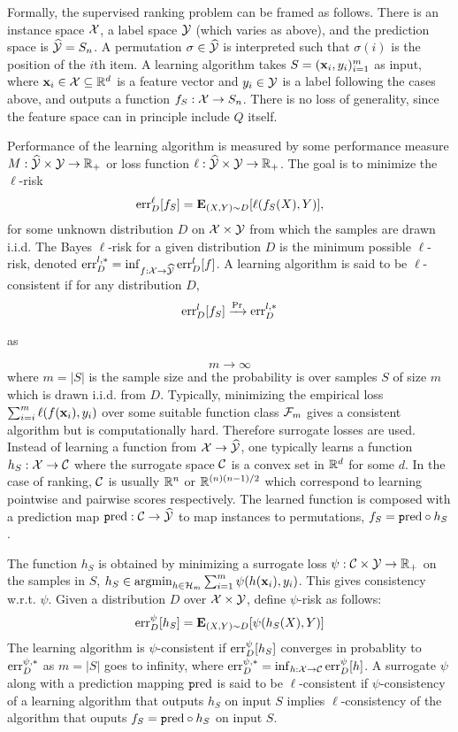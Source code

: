 Formally, the supervised ranking problem can be framed as follows. There is an
instance space ${\mathcal X}$, a label space ${\mathcal Y}$ (which varies as above), and the
prediction space is $\widehat{\mathcal{Y}} = S_n$. A permutation
$\sigma \in \widehat{\mathcal{Y}}$ is interpreted such that $\sigma(i)$ is the position of the
$i$th item. A learning algorithm
takes $S = ({\mathbf x}_i, y_i)_{i=1}^m$ as input,
where ${\mathbf x}_{i} \in {\mathcal X} \subseteq {\mathbb R}^d$ is a feature vector
and $y_i \in {\mathcal Y}$ is a label following the cases above,
and outputs a function
$f_S: {\mathcal X} \to S_n$.
There is no loss of generality, since the feature space can in principle 
include $Q$ itself.

Performance of the learning algorithm is measured by some performance measure
$M: \widehat{\mathcal{Y}} \times {\mathcal Y} \to {\mathbb R}_+$ or loss function
$\ell: \widehat{\mathcal{Y}} \times {\mathcal Y} \to {\mathbb R}_+$. The goal is to minimize the $\ell$-risk
\begin{align*}
  \text{err}_D^\ell[f_S] = {\mathbf E}_{({X}, Y) \sim D} [\ell(f_S({X}), Y)],
\end{align*}
for some unknown distribution $D$ on ${\mathcal X} \times {\mathcal Y}$ from which the samples are drawn i.i.d.
The Bayes $\ell$-risk for a given distribution $D$ is the minimum possible $\ell$-risk, denoted $\text{err}^{l,*}_D = \inf_{f:{\mathcal X} \to \widehat{\mathcal{Y}}} \text{err}^l_D[f]$. A learning algorithm is said to be $\ell$-consistent if for any distribution $D$,
$$\text{err}_D^l[f_S] \xrightarrow{\Pr} \text{err}_D^{l,*}$$
\begin{center}
 as
\end{center}
$$m \to \infty$$
where $m = |S|$ is the sample size and the probability is over samples $S$ of
size $m$ which is drawn i.i.d. from $D$. Typically, minimizing the empirical
loss $\sum_{i=i}^m \ell(f({\mathbf x}_i),y_i)$ over some suitable function class ${\mathcal F}_m$
gives a consistent algorithm but is computationally hard.
Therefore surrogate losses are used. Instead of learning a function from
${\mathcal X} \to \widehat{\mathcal{Y}}$, one typically learns a function $h_S:{\mathcal X} \to {\mathcal C}$ where the
surrogate space ${\mathcal C}$ is a convex set in ${\mathbb R}^d$ for some $d$. In the case of
ranking, ${\mathcal C}$ is usually ${\mathbb R}^n$ or ${\mathbb R}^{(n)(n-1)/2}$ which correspond to learning
pointwise and pairwise scores respectively.
The learned function is composed with a prediction map $\text{\texttt pred}: {\mathcal C} \to \widehat{\mathcal{Y}}$ to
map instances to permutations, $f_S = \text{\texttt pred} \circ h_S$.

The function $h_S$ is obtained by minimizing a surrogate loss $\psi:{\mathcal C} \times {\mathcal Y} \to {\mathbb R}_+$ on the samples in $S$, $h_S \in \textup{\textrm{argmin}}_{h\in{\mathcal H}_m}\sum_{i=1}^m \psi(h({\mathbf x}_i),y_i)$. This gives consistency w.r.t. $\psi$. Given a distribution $D$ over ${\mathcal X} \times {\mathcal Y}$, define $\psi$-risk as follows:
$$\text{err}_D^\psi[h_S] = {\mathbf E}_{(X,Y)\sim D}[\psi(h_S(X),Y)]$$
The learning algorithm is $\psi$-consistent if $\text{err}_D^\psi[h_S]$ converges in probablity to $\text{err}_D^{\psi,*}$ as $m = |S|$ goes to infinity, where $\text{err}_D^{\psi,*} = \inf_{h:{\mathcal X} \to {\mathcal C}}\text{err}_D^\psi[h]$. A surrogate $\psi$ along with a prediction mapping $\text{\texttt pred}$ is said to be $\ell$-consistent if $\psi$-consistency of a learning algorithm that outputs $h_S$ on input $S$ implies $\ell$-consistency of the algorithm that ouputs $f_S = \text{\texttt pred} \circ h_S$ on input $S$.

